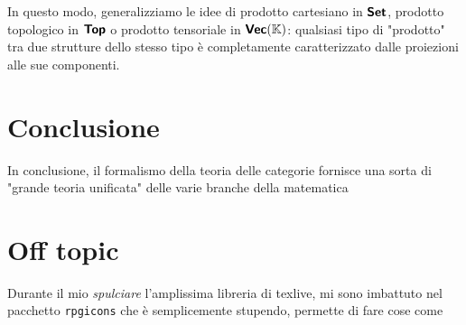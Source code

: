 \documentclass{article}
\begin{document}
In questo modo, generalizziamo le idee di prodotto cartesiano in $\text{\sffamily\textbf{Set}}$, prodotto topologico in $\text{\sffamily\textbf{Top}}$ o prodotto tensoriale in $\text{\sffamily\textbf{Vec}}(\mathbb{K})$: qualsiasi tipo di "prodotto" tra due strutture dello stesso tipo è completamente caratterizzato dalle proiezioni alle sue componenti.

\section{Conclusione}
\label{sec:Ending}

In conclusione, il formalismo della teoria delle categorie fornisce una sorta di "grande teoria unificata" delle varie branche della matematica

\section{Off topic}

Durante il mio \emph{spulciare} l'amplissima libreria di texlive, mi sono imbattuto nel pacchetto \texttt{rpgicons} che è semplicemente stupendo, permette di fare cose come 

\printbibliography
\end{document}
